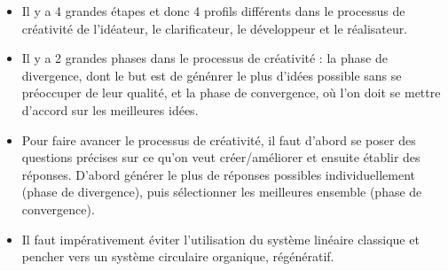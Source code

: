 \begin{itemize}
	\item Il y a 4 grandes étapes et donc 4 profils différents dans le processus de créativité de l'idéateur,
	le clarificateur, le développeur et le réalisateur.
	\item Il y a 2 grandes phases dans le processus de créativité : la phase de divergence,
	dont le but est de génénrer le plus d'idées possible sans se préoccuper de leur qualité,
	et la phase de convergence, où l'on doit se mettre d'accord sur les meilleures idées.
	\item Pour faire avancer le processus de créativité, il faut d'abord se poser des questions
	précises sur ce qu'on veut créer/améliorer et ensuite établir des réponses. D'abord générer
	le plus de réponses possibles individuellement (phase de divergence), puis sélectionner
	les meilleures ensemble (phase de convergence).
	\item Il faut impérativement éviter l'utilisation du système linéaire classique et pencher
	vers un système circulaire organique, régénératif.
\end{itemize}


